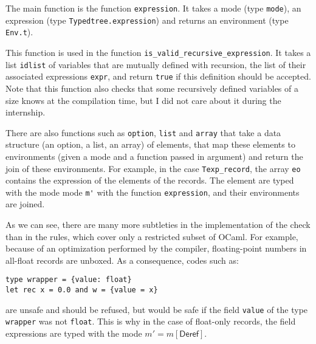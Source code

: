 \documentclass{article}
\newcommand{\Deref}{\mathsf{Deref}}
\begin{document}
The main function is the function \lstinline|expression|. It takes a mode (type
\lstinline|mode|), an expression (type \lstinline|Typedtree.expression|) and
returns an environment (type \lstinline|Env.t|).

This function is used in the function \lstinline|is_valid_recursive_expression|.
It takes a list \lstinline|idlist| of variables that are mutually defined with
recursion, the list of their associated expressions \lstinline|expr|, and
return \lstinline|true| if this definition should be accepted. Note that this
function also checks that some recursively defined variables of a size knows at
the compilation time, but I did not care about it during the internship.



There are also functions such as \lstinline|option|, \lstinline|list| and
\lstinline|array| that take a data structure (an option, a list, an array) of
elements, that map these elements to environments (given a mode and a function
passed in argument) and return the join of these environments. For example, in
the case \lstinline|Texp_record|, the array \lstinline|eo| contains the
expression of the elements of the records. The element are typed with the mode
mode \lstinline|m'| with the function \lstinline|expression|, and their
environments are joined.

As we can see, there are many more subtleties in the implementation of the
check than in the rules, which cover only a restricted subset of OCaml. For
example, because of an optimization performed by the compiler, floating-point
numbers in all-float records are unboxed. As a consequence, codes such as:
\begin{lstlisting}
type wrapper = {value: float}
let rec x = 0.0 and w = {value = x}
\end{lstlisting}
are unsafe and should be refused, but would be safe if the field
\lstinline|value| of the type \lstinline|wrapper| was not \lstinline|float|.
This is why in the case of float-only records, the field expressions are typed
with the mode $m' = m[\Deref]$.
\end{document}

